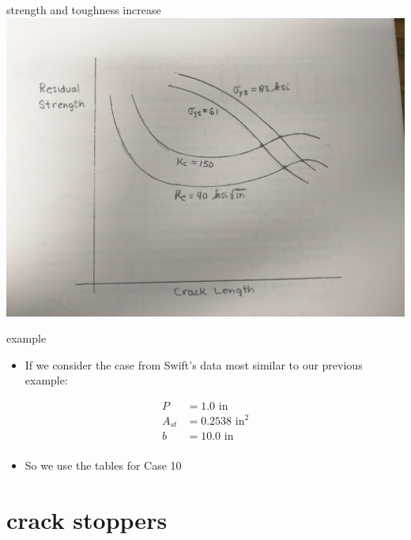 \documentclass[
  letterpaper,
  ignorenonframetext,
  aspectratio=43,
  handout,
  12pt]{beamer}
\providecommand{\tightlist}{%
  \setlength{\itemsep}{0pt}\setlength{\parskip}{0pt}}
\providecommand{\tightlist}{%
\setlength{\itemsep}{0pt}\setlength{\parskip}{0pt}}
\let\Oldincludegraphics\includegraphics
\renewcommand{\includegraphics}[2][]{\Oldincludegraphics[width=\textwidth,height=0.7\textheight,keepaspectratio]{#2}}
\begin{document}
\begin{frame}{strength and toughness increase}
\protect\hypertarget{strength-and-toughness-increase}{}
\includegraphics{../images/strength_increase.jpg}
\end{frame}

\begin{frame}{example}
\protect\hypertarget{example}{}
\begin{itemize}
\tightlist
\item
  If we consider the case from Swift's data most similar to our previous
  example:
\end{itemize}

\[\begin{aligned}
  P &= 1.0 \text{ in}\\
  A_{st} &= 0.2538 \text{ in}^2\\
  b &= 10.0 \text{ in}\\
\end{aligned}\]

\begin{itemize}
\tightlist
\item
  So we use the tables for Case 10
\end{itemize}
\end{frame}

\hypertarget{crack-stoppers}{%
\section{crack stoppers}\label{crack-stoppers}}
\end{document}
